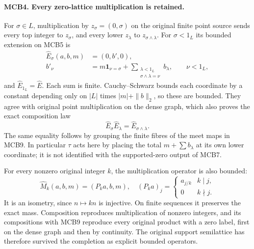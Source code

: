\paragraph{MCB4. Every zero-lattice multiplication is retained.}
For \(\sigma\in L\), multiplication by \(z_\sigma=(0,\sigma)\)
on the original finite point source sends every top integer to
\(z_\sigma\), and every lower \(z_\lambda\) to
\(z_{\sigma\wedge\lambda}\). For \(\sigma<1_L\) its bounded
extension on MCB5 is
\[
 \begin{split}
 \widehat E_\sigma(a,b,m)&=(0,b',0),\\
 b'_\nu&=m\mathbf1_{\nu=\sigma}
     +\sum_{\substack{\lambda<1_L\\\sigma\wedge\lambda=\nu}}
           b_\lambda,\qquad \nu<1_L,
 \end{split}\tag{MCB9}
\]
and \(\widehat E_{1_L}=\widehat E\). Each sum is finite.
Cauchy--Schwarz bounds each coordinate by a constant depending
only on \(|L|\) times \(|m|+\|b\|_2\), so these are bounded.
They agree with original point multiplication on the dense graph,
which also proves the exact composition law
\[
 \widehat E_\sigma\widehat E_\lambda
                 =\widehat E_{\sigma\wedge\lambda}.           \tag{MCB10}
\]
The same equality follows by grouping the finite fibres of the
meet maps in MCB9. In particular \(\tau\) acts here by placing
the total \(m+\sum b_\lambda\) at its own lower coordinate;
it is not identified with the supported-zero output of MCB7.

For every nonzero original integer \(k\), the multiplication
operator is also bounded:
\[
 \widehat M_k(a,b,m)=(P_ka,b,m),\quad
 (P_ka)_j=\begin{cases}a_{j/k}&k\mid j,\\0&k\nmid j.\end{cases}
                                                               \tag{MCB11}
\]
It is an isometry, since \(n\mapsto kn\) is injective.
On finite sequences it preserves the exact mass. Composition
reproduces multiplication of nonzero integers, and its compositions
with MCB9 reproduce every original product with a zero label,
first on the dense graph and then by continuity. The original
support semilattice has therefore survived the completion as
explicit bounded operators.

